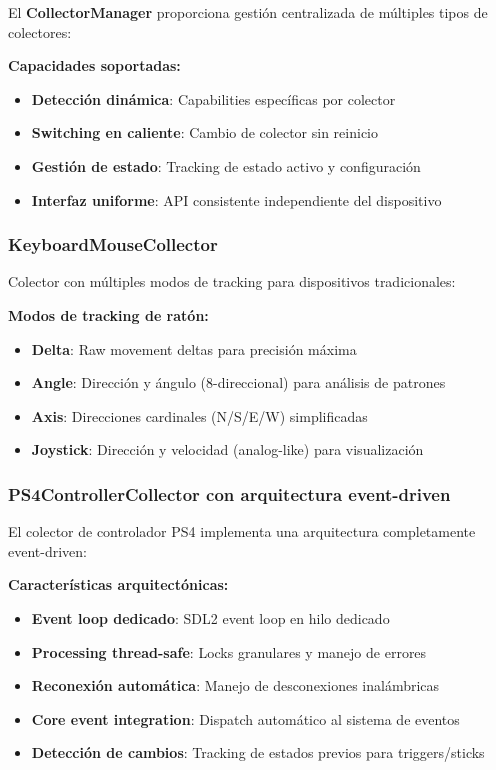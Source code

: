 El \textbf{CollectorManager} proporciona gestión centralizada de múltiples tipos de colectores:

\textbf{Capacidades soportadas:}
\begin{itemize}
    \item \textbf{Detección dinámica}: Capabilities específicas por colector
    \item \textbf{Switching en caliente}: Cambio de colector sin reinicio
    \item \textbf{Gestión de estado}: Tracking de estado activo y configuración
    \item \textbf{Interfaz uniforme}: API consistente independiente del dispositivo
\end{itemize}

\subsubsection{KeyboardMouseCollector}

Colector con múltiples modos de tracking para dispositivos tradicionales:

\textbf{Modos de tracking de ratón:}
\begin{itemize}
    \item \textbf{Delta}: Raw movement deltas para precisión máxima
    \item \textbf{Angle}: Dirección y ángulo (8-direccional) para análisis de patrones
    \item \textbf{Axis}: Direcciones cardinales (N/S/E/W) simplificadas
    \item \textbf{Joystick}: Dirección y velocidad (analog-like) para visualización
\end{itemize}

\subsubsection{PS4ControllerCollector con arquitectura event-driven}

El colector de controlador PS4 implementa una arquitectura completamente event-driven:

\textbf{Características arquitectónicas:}
\begin{itemize}
    \item \textbf{Event loop dedicado}: SDL2 event loop en hilo dedicado
    \item \textbf{Processing thread-safe}: Locks granulares y manejo de errores
    \item \textbf{Reconexión automática}: Manejo de desconexiones inalámbricas
    \item \textbf{Core event integration}: Dispatch automático al sistema de eventos
    \item \textbf{Detección de cambios}: Tracking de estados previos para triggers/sticks
\end{itemize}

